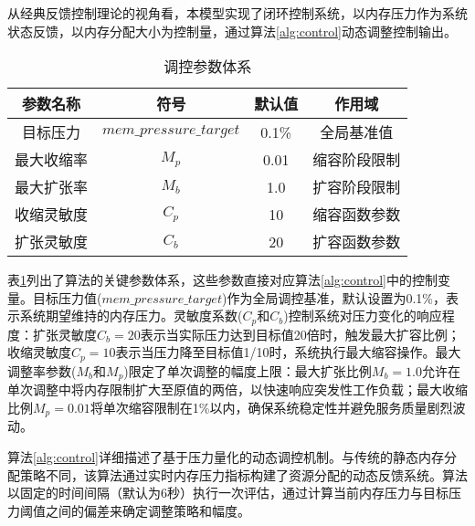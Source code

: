 从经典反馈控制理论的视角看，本模型实现了闭环控制系统，以内存压力作为系统状态反馈，以内存分配大小为控制量，通过算法\ref{alg:control}动态调整控制输出。

\begin{table}[H]
\centering
\caption{调控参数体系}
\label{tab:params}
\begin{tabular}{cccc}
\toprule
参数名称 & 符号 & 默认值 & 作用域 \\
\midrule
目标压力 & \(mem\_pressure\_target\) & 0.1\% & 全局基准值 \\
最大收缩率 & \(M_p\) & 0.01 & 缩容阶段限制 \\
最大扩张率 & \(M_b\) & 1.0 & 扩容阶段限制 \\
收缩灵敏度 & \(C_p\) & 10 & 缩容函数参数 \\
扩张灵敏度 & \(C_b\) & 20 & 扩容函数参数 \\
\bottomrule
\end{tabular}
\end{table}

表\ref{tab:params}列出了算法的关键参数体系，这些参数直接对应算法\ref{alg:control}中的控制变量。目标压力值(\(mem\_pressure\_target\))作为全局调控基准，默认设置为0.1\%，表示系统期望维持的内存压力。灵敏度系数(\(C_p\)和\(C_b\))控制系统对压力变化的响应程度：扩张灵敏度\(C_b = 20\)表示当实际压力达到目标值20倍时，触发最大扩容比例；收缩灵敏度\(C_p = 10\)表示当压力降至目标值1/10时，系统执行最大缩容操作。最大调整率参数(\(M_b\)和\(M_p\))限定了单次调整的幅度上限：最大扩张比例\(M_b = 1.0\)允许在单次调整中将内存限制扩大至原值的两倍，以快速响应突发性工作负载；最大收缩比例\(M_p = 0.01\)将单次缩容限制在1\%以内，确保系统稳定性并避免服务质量剧烈波动。

算法\ref{alg:control}详细描述了基于压力量化的动态调控机制。与传统的静态内存分配策略不同，该算法通过实时内存压力指标构建了资源分配的动态反馈系统。算法以固定的时间间隔（默认为6秒）执行一次评估，通过计算当前内存压力与目标压力阈值之间的偏差来确定调整策略和幅度。

